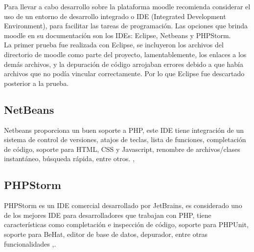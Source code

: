 Para llevar a cabo desarrollo sobre la plataforma moodle recomienda considerar el uso de un entorno de desarrollo integrado o IDE (Integrated Development Environment), para facilitar las tareas de programación. Las opciones que brinda moodle en su documentación son los IDEs: Eclipse, Netbeans y PHPStorm.\\

\noindent La primer prueba fue realizada con Eclipse, se incluyeron los archivos del directorio de moodle como parte del proyecto, lamentablemente, los enlaces a los demás archivos, y la depuración de código arrojaban errores debido a que había archivos que no podía vincular correctamente. Por lo que Eclipse fue descartado posterior a la prueba.

\subsection{NetBeans}

Netbeans proporciona un buen soporte a PHP, este IDE tiene integración de un sistema de control de versiones, atajos de teclas, lista de funciones, completación de código, soporte para HTML, CSS y Javascript, renombre de archivos/clases instantáneo, búsqueda rápida, entre otros. \cite{NetBeans}, \cite{moodleNetbeans}


\subsection{PHPStorm}

PHPStorm es un IDE comercial desarrollado por JetBrains, es considerado uno de los mejores IDE para desarrolladores que trabajan con PHP, tiene características como completación e inspección de código, soporte para PHPUnit, soporte para BeHat, editor de base de datos, depurador, entre otras funcionalidades \cite{PHPStorm},\cite{  moodlePHPStorm}.


